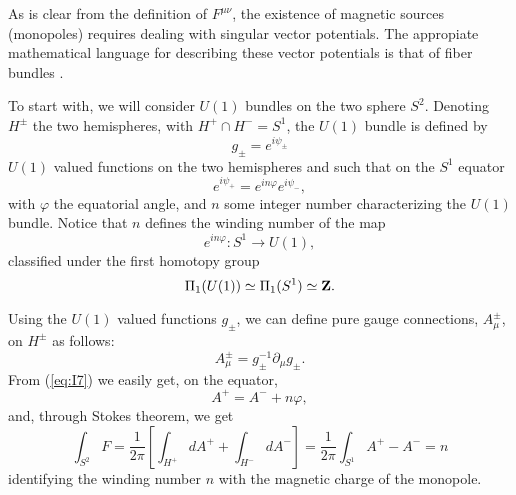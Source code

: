 As is clear from the definition of $F^{\mu \nu}$, the
existence of magnetic sources (monopoles) \cite{D1931} requires dealing with
singular vector potentials. The appropiate mathematical language
for describing these vector potentials is that of fiber bundles \cite{WY}. 
  
To start with, we will consider $U(1)$ bundles on the two sphere
$S^2$. Denoting $H^{\pm}$ the two hemispheres, with $H^+ \cap
H^- = S^1$, the $U(1)$ bundle is defined by
\begin{equation}
g_{\pm} = e^{i\psi_{\pm}}
\label{eq:I6}
\end{equation}
$U(1)$ valued functions on the two hemispheres and such that on
the $S^1$ equator
\begin{equation}
e^{i \psi_{+}}=e^{i n \varphi}e^{i \psi_{-}},
\label{eq:I7}
\end{equation}
with $\varphi$ the equatorial angle, and $n$ some integer number
characterizing the $U(1)$ bundle. Notice that $n$ defines the
winding number of the map
\begin{equation}
e^{i n \varphi} : S^1 \longrightarrow U(1),
\label{eq:I8}
\end{equation}
classified under the first homotopy group
\begin{equation}
\Pi_1(U(1)) \simeq \Pi_1(S^1) \simeq {\bf Z}.
\label{eq:I9}
\end{equation}
  
Using the $U(1)$ valued functions $g_{\pm}$, we can define pure
gauge connections, $A_{\mu}^{\pm}$, on $H^{\pm}$ as follows:
\begin{equation}
A_{\mu}^{\pm} = g_{\pm}^{-1} \partial _{\mu} g_{\pm}.
\label{eq:I10}
\end{equation}
From (\ref{eq:I7}) we easily get, on the equator,
\begin{equation}		
A^{+}=A^{-}+n  \varphi,
\label{eq:I11}
\end{equation}
and, through Stokes theorem, we get
\begin{equation}
\int_{S^{2}} F = 
 \frac {1}{2 \pi}[\int_{H^{+}} dA^{+} + \int_{H^{-}} dA^{-}] =
 \frac {1}{2 \pi} \int_{S^{1}} A^{+} - A^{-} = n
\label{eq:I12} 
\end{equation}
identifying the winding number $n$ with the magnetic charge of
the monopole. 
  
